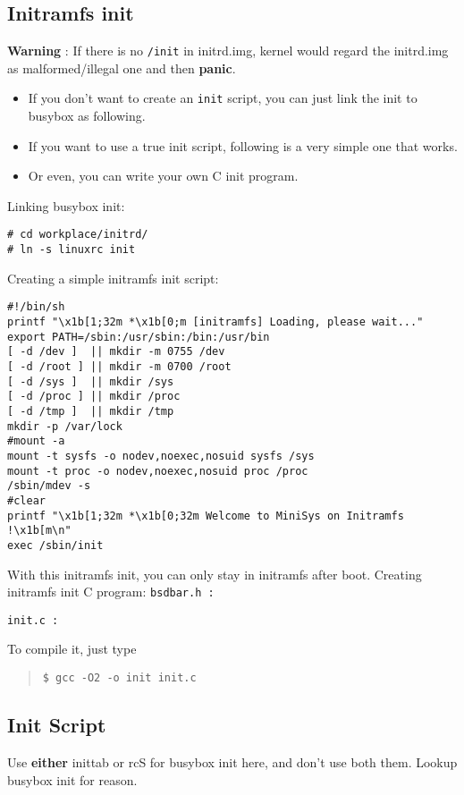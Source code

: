 \documentclass[10pt,a4paper]{article}
\begin{document}
\subsection{Initramfs init}
\textbf{Warning} : If there is no \texttt{/init} in initrd.img,
	kernel would regard the initrd.img as malformed/illegal one and then \textbf{panic}.
\begin{itemize}
\item If you don't want to create an \texttt{init} script, you can just link the init to busybox as following.
\item If you want to use a true init script, following is a very simple one that works.
\item Or even, you can write your own C init program.
\end{itemize}
Linking busybox init:
\begin{framed}\begin{verbatim}
# cd workplace/initrd/
# ln -s linuxrc init
\end{verbatim}\end{framed}
Creating a simple initramfs init script:
\begin{framed}\begin{verbatim}
#!/bin/sh
printf "\x1b[1;32m *\x1b[0;m [initramfs] Loading, please wait..."
export PATH=/sbin:/usr/sbin:/bin:/usr/bin
[ -d /dev ]  || mkdir -m 0755 /dev
[ -d /root ] || mkdir -m 0700 /root
[ -d /sys ]  || mkdir /sys
[ -d /proc ] || mkdir /proc
[ -d /tmp ]  || mkdir /tmp
mkdir -p /var/lock
#mount -a
mount -t sysfs -o nodev,noexec,nosuid sysfs /sys
mount -t proc -o nodev,noexec,nosuid proc /proc
/sbin/mdev -s
#clear
printf "\x1b[1;32m *\x1b[0;32m Welcome to MiniSys on Initramfs !\x1b[m\n"
exec /sbin/init
\end{verbatim}\end{framed}
With this initramfs init, you can only stay in initramfs after boot.\newline
Creating initramfs init C program:\newline
\texttt{bsdbar.h :}

\texttt{init.c :}

To compile it, just type
\begin{quote}
    \texttt{\$ gcc -O2 -o init init.c}
\end{quote}

\subsection{Init Script}
Use \textbf{either} inittab or rcS for busybox init here, and don't use both them.\newline
Lookup busybox init for reason\cite{bib:busybox.net}.
\end{document}
